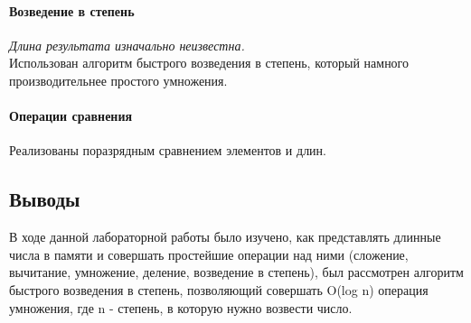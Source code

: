 \documentclass[12pt]{article}
\begin{document}
\paragraph{Возведение в степень} {\it Длина результата изначально неизвестна.}\\
Использован алгоритм быстрого возведения в степень, который намного производительнее простого умножения.

\paragraph{Операции сравнения} Реализованы поразрядным сравнением элементов и длин.

\subsection*{Выводы}
В ходе данной лабораторной работы было изучено, как представлять длинные числа в памяти и совершать простейшие операции над ними (сложение, вычитание, умножение, деление, возведение в степень), был рассмотрен алгоритм быстрого возведения в степень, позволяющий совершать O(log n) операция умножения, где n - степень, в которую нужно возвести число.
\end{document}
